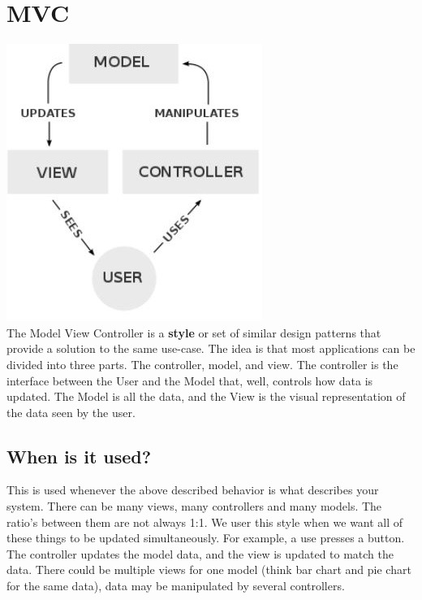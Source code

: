 \documentclass[12pt]{article}
\theoremstyle{definition}
\begin{document}
\section{MVC}
\includegraphics{mvc}\\
The Model View Controller is a \textbf{style} or set of similar design patterns that provide a solution to the same use-case. The idea is that most applications can be divided into three parts. The controller, model, and view. The controller is the interface between the User and the Model that, well, controls how data is updated. The Model is all the data, and the View is the visual representation of the data seen by the user.
\subsection{When is it used?}
This is used whenever the above described behavior is what describes your system. There can be many views, many controllers and many models. The ratio's between them are not always 1:1. We user this style when we want all of these things to be updated simultaneously. For example, a use presses a button. The controller updates the model data, and the view is updated to match the data. There could be multiple views for one model (think bar chart and pie chart for the same data), data may be manipulated by several controllers.
\\ \linebreak
\end{document}
